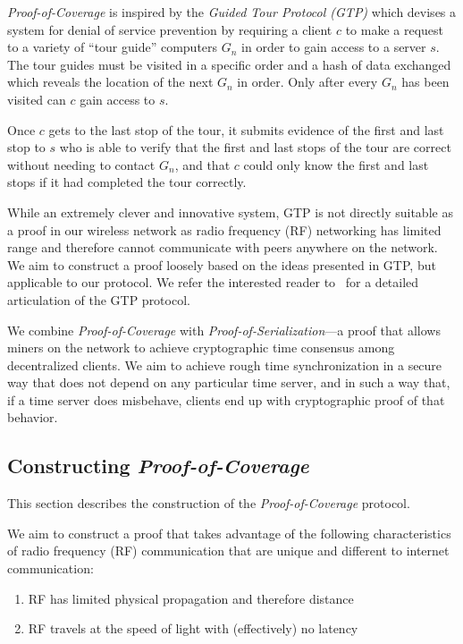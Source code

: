 \documentclass[letterpaper,11pt]{article}
\begin{document}
\emph{Proof-of-Coverage} is inspired by the \emph{Guided Tour Protocol (GTP)} which devises a system for denial of service prevention by requiring a client $c$ to make a request to a variety of ``tour guide'' computers $G_n$ in order to gain access to a server $s$. The tour guides must be visited in a specific order and a hash of data exchanged which reveals the location of the next $G_n$ in order. Only after every $G_n$ has been visited can $c$ gain access to $s$.

Once $c$ gets to the last stop of the tour, it submits evidence of the first and last stop to $s$ who is able to verify that the first and last stops of the tour are correct without needing to contact $G_n$, and that $c$ could only know the first and last stops if it had completed the tour correctly.

While an extremely clever and innovative system, GTP is not directly suitable as a proof in our wireless network as radio frequency (RF) networking has limited range and therefore cannot communicate with peers anywhere on the network. We aim to construct a proof loosely based on the ideas presented in GTP, but applicable to our protocol. We refer the interested reader to~\cite{gtp} for a detailed articulation of the GTP protocol.

We combine \emph{Proof-of-Coverage} with \emph{Proof-of-Serialization}---a proof that allows miners on the network to achieve cryptographic time consensus among decentralized clients. We aim to achieve rough time synchronization in a secure way that does not depend on any particular time server, and in such a way that, if a time server does misbehave, clients end up with cryptographic proof of that behavior.

\subsection{Constructing \emph{Proof-of-Coverage}}

This section describes the construction of the \emph{Proof-of-Coverage} protocol.

We aim to construct a proof that takes advantage of the following characteristics of radio frequency (RF) communication that are unique and different to internet communication:

\begin{enumerate}
    \item RF has limited physical propagation and therefore distance
    \item RF travels at the speed of light with (effectively) no latency
\end{enumerate}
\end{document}
